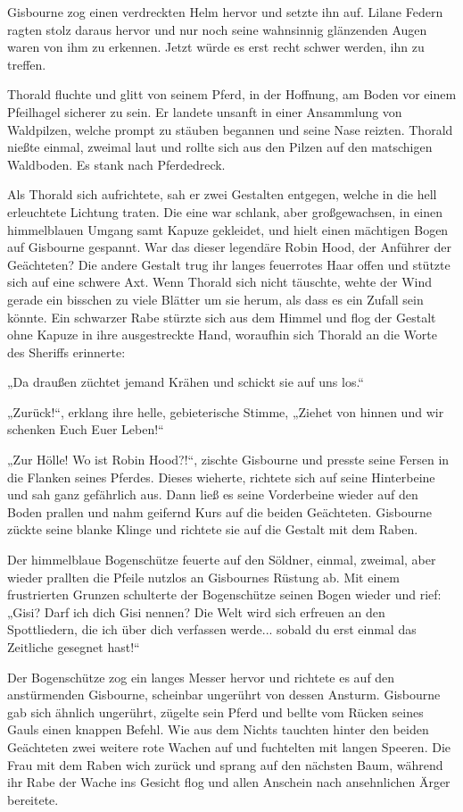 \documentclass[10pt, a4paper, oneside]{book}
\begin{document}
Gisbourne zog einen verdreckten Helm hervor und setzte ihn auf. Lilane Federn ragten stolz daraus hervor und nur noch seine wahnsinnig glänzenden Augen waren von ihm zu erkennen. Jetzt würde es erst recht schwer werden, ihn zu treffen.

Thorald fluchte und glitt von seinem Pferd, in der Hoffnung, am Boden vor einem Pfeilhagel sicherer zu sein. Er landete unsanft in einer Ansammlung von Waldpilzen, welche prompt zu stäuben begannen und seine Nase reizten. Thorald nießte einmal, zweimal laut und rollte sich aus den Pilzen auf den matschigen Waldboden. Es stank nach Pferdedreck.

Als Thorald sich aufrichtete, sah er zwei Gestalten entgegen, welche in die hell erleuchtete Lichtung traten. Die eine war schlank, aber großgewachsen, in einen himmelblauen Umgang samt Kapuze gekleidet, und hielt einen mächtigen Bogen auf Gisbourne gespannt. War das dieser legendäre Robin Hood, der Anführer der Geächteten? Die andere Gestalt trug ihr langes feuerrotes Haar offen und stützte sich auf eine schwere Axt. Wenn Thorald sich nicht täuschte, wehte der Wind gerade ein bisschen zu viele Blätter um sie herum, als dass es ein Zufall sein könnte. Ein schwarzer Rabe stürzte sich aus dem Himmel und flog der Gestalt ohne Kapuze in ihre ausgestreckte Hand, woraufhin sich Thorald an die Worte des Sheriffs erinnerte:

„Da draußen züchtet jemand Krähen und schickt sie auf uns los.“

„Zurück!“, erklang ihre helle, gebieterische Stimme, „Ziehet von hinnen und wir schenken Euch Euer Leben!“

„Zur Hölle! Wo ist Robin Hood?!“, zischte Gisbourne und presste seine Fersen in die Flanken seines Pferdes. Dieses wieherte, richtete sich auf seine Hinterbeine und sah ganz gefährlich aus. Dann ließ es seine Vorderbeine wieder auf den Boden prallen und nahm geifernd Kurs auf die beiden Geächteten. Gisbourne zückte seine blanke Klinge und richtete sie auf die Gestalt mit dem Raben.

Der himmelblaue Bogenschütze feuerte auf den Söldner, einmal, zweimal, aber wieder prallten die Pfeile nutzlos an Gisbournes Rüstung ab. Mit einem frustrierten Grunzen schulterte der Bogenschütze seinen Bogen wieder und rief: „Gisi? Darf ich dich Gisi nennen? Die Welt wird sich erfreuen an den Spottliedern, die ich über dich verfassen werde... sobald du erst einmal das Zeitliche gesegnet hast!“

Der Bogenschütze zog ein langes Messer hervor und richtete es auf den anstürmenden Gisbourne, scheinbar ungerührt von dessen Ansturm. Gisbourne gab sich ähnlich ungerührt, zügelte sein Pferd und bellte vom Rücken seines Gauls einen knappen Befehl. Wie aus dem Nichts tauchten hinter den beiden Geächteten zwei weitere rote Wachen auf und fuchtelten mit langen Speeren. Die Frau mit dem Raben wich zurück und sprang auf den nächsten Baum, während ihr Rabe der Wache ins Gesicht flog und allen Anschein nach ansehnlichen Ärger bereitete.
\end{document}
